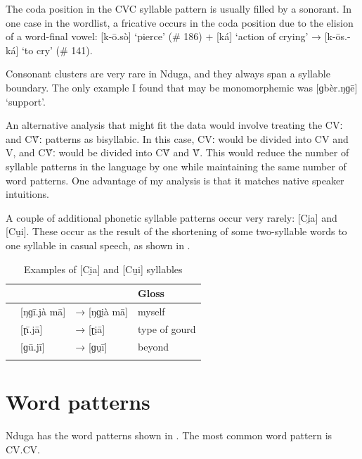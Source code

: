 \documentclass[output=paper,colorlinks,citecolor=brown
]{langscibook}
\begin{document}
The coda position in the CVC syllable pattern is usually filled by a sonorant. In one case in the wordlist, a fricative occurs in the coda position due to the elision of a word-final vowel: [k-ō.sò] ‘pierce’ (\# 186) + [ká] ‘action of crying’ → [k-ōs.-ká] ‘to cry’ (\# 141).

Consonant clusters are very rare in Nduga, and they always span a syllable boundary. The only example I found that may be monomorphemic was [ɡbèr.ŋɡē] `support'. 

An alternative analysis that might fit the data would involve treating the CVː and CṼː patterns as bisyllabic. In this case, CVː would be divided into CV and V, and CṼː would be divided into CṼ and Ṽ. This would reduce the number of syllable patterns in the language by one while maintaining the same number of word patterns. One advantage of my analysis is that it matches native speaker intuitions.

A couple of additional phonetic syllable patterns occur very rarely: [Ci̯a] and [Cu̯i]. These occur as the result of the shortening of some two-syllable words to one syllable in casual speech, as shown in .

\begin{table}
\caption{Examples of [Ci̯a] and [Cu̯i] syllables}
\label{tab:olson:examples}
 \begin{tabular}{llll}
  \lsptoprule
 &  &  & Gloss \\
  \midrule
 & [ŋɡī.jà mā] & → [ŋɡi̯à mā] & myself \\
 & [ɽī.jā] & → [ɽi̯ā] & type of gourd \\
 & [ɡū.jī] & → [ɡu̯ī] & beyond \\
  \lspbottomrule
 \end{tabular}
\end{table}

\section{Word patterns}
\label{sec:olson:word}

Nduga has the word patterns shown in . The most common word pattern is CV.CV.
\end{document}
